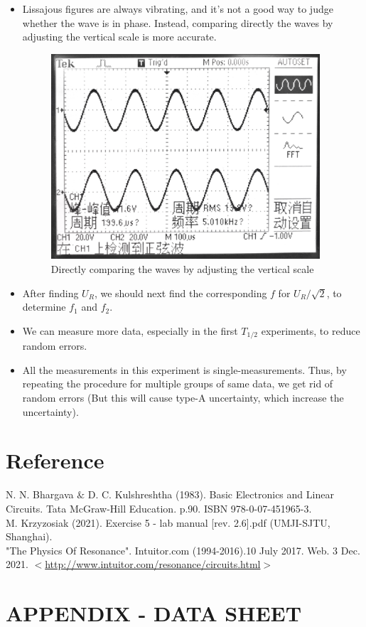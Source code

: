 \documentclass[a4paper]{article}
\begin{document}
\begin{itemize}
\item Lissajous figures are always vibrating, and it's not a good way to judge whether the wave is in phase. Instead, comparing directly the waves by adjusting the vertical scale is more accurate.

\begin{figure}[!htbp]
\center
\includegraphics[width=10cm]{imp.jpg}
\caption{Directly comparing the waves by adjusting the vertical scale}
\end{figure}

\item After finding $U_R$, we should next find the corresponding $f$ for $U_R/\sqrt{2}$, to determine $f_1$ and $f_2$.
\item We can measure more data, especially in the first $T_{1/2}$ experiments, to reduce random errors.
\item All the measurements in this experiment is single-measurements. Thus, by repeating the procedure for multiple groups of same data, we get rid of random errors (But this will cause type-A uncertainty, which increase the uncertainty).
\end{itemize}



\newpage
\section{Reference}
\noindent [1] N. N. Bhargava $\&$ D. C. Kulshreshtha (1983). Basic Electronics and Linear Circuits. Tata McGraw-Hill Education. p.90. ISBN 978-0-07-451965-3. \\
\noindent [2] M. Krzyzosiak (2021). Exercise 5 - lab manual [rev. 2.6].pdf (UMJI-SJTU, Shanghai). \\
\noindent [3] "The Physics Of Resonance". Intuitor.com (1994-2016).10 July 2017. Web. 3 Dec. 2021. $<$\url{http://www.intuitor.com/resonance/circuits.html}$>$


\newpage
\section*{APPENDIX - DATA SHEET}



\end{document}
